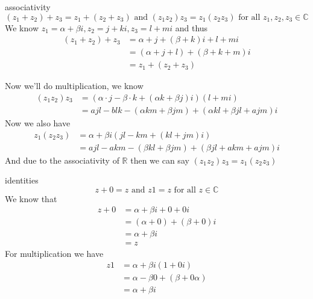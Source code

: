 \documentclass[11pt]{book}
\begin{document}
\begin{ver}
    associativity 
    \begin{equation*}
        \left( z_1 + z_2 \right) + z_3 = z_1 + \left( z_2 + z_3 \right) \text{ and } \left( z_1 z_2 \right)z_3 = z_1\left( z_2z_3 \right) \text{ for all } z_1, z_2, z_3 \in \mathbb{C}
    \end{equation*}
    We know $z_1 = \alpha + \beta i, z_2 = j + k i, z_3 = l + m i$ and thus 
    \begin{align*}
        \left( z_1 + z_2 \right) + z_3 &= \alpha  + j + \left( \beta  + k \right) i + l + m i \\
                                       &= \left( \alpha + j + l \right) + \left( \beta + k + m \right) i \\
                                       &= z_1 + \left( z_2 + z_3 \right) 
    \end{align*}

    Now we'll do multiplication, we know
    \begin{align*}
        \left( z_1z_2 \right)z_3 &= \left(   \alpha  \cdot j - \beta  \cdot k + \left( \alpha k + \beta j \right) i \right) \left( l + m i \right) \\
                                 &= ajl - blk - \left( \alpha km + \beta jm \right) + \left( \alpha kl + \beta jl + ajm \right) i
    \end{align*}
    Now we also have
    \begin{align*}
        z_1\left( z_2z_3 \right) &= \alpha + \beta i\left( jl - km + \left( kl + jm \right)i \right)\\
                                 &= ajl - akm - \left( \beta kl + \beta jm \right) + \left( \beta jl + akm + ajm \right) i
    \end{align*}
    And due to the associativity of $\mathbb{R}$ then we can say $\left( z_1z_2 \right)z_3 = z_1 \left( z_2z_3 \right)$ 
\end{ver}

\begin{ver}
    identities
    \begin{equation*}
        z + 0 = z \text{ and } z1 = z \text{ for all } z \in \mathbb{C}
    \end{equation*}
    We know that 
    \begin{align*}
        z + 0 &= \alpha + \beta i + 0 + 0 i\\
              &= \left( \alpha + 0 \right) + \left( \beta + 0 \right) i \\
              &= \alpha + \beta i\\
              &= z  
    \end{align*}
    For multiplication we have
    \begin{align*}
        z1 &=\alpha + \beta i\left( 1 + 0i \right)\\
           &= \alpha - \beta 0 + \left( \beta + 0\alpha  \right)\\
           &= \alpha + \beta i\\
    \end{align*}
\end{ver}
\end{document}

